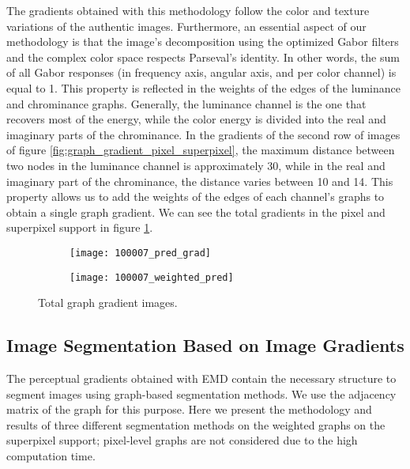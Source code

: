 The gradients obtained with this methodology follow the color and texture variations of the authentic images. Furthermore, an essential aspect of our methodology is that the image's decomposition using the optimized Gabor filters and the complex color space respects Parseval's identity. In other words, the sum of all Gabor responses (in frequency axis, angular axis, and per color channel) is equal to 1. This property is reflected in the weights of the edges of the luminance and chrominance graphs. Generally, the luminance channel is the one that recovers most of the energy, while the color energy is divided into the real and imaginary parts of the chrominance. In the gradients of the second row of images of figure \ref{fig:graph_gradient_pixel_superpixel}, the maximum distance between two nodes in the luminance channel is approximately 30, while in the real and imaginary part of the chrominance, the distance varies between 10 and 14. This property allows us to add the weights of the edges of each channel's graphs to obtain a single graph gradient. We can see the total gradients in the pixel and superpixel support in figure \ref{fig:total_graph_gradient_pixel_superpixel}.

\begin{figure}[!ht]
    \centering
    \begin{subfigure}[b]{0.49\textwidth}
    	\texttt{[image: 100007\_pred\_grad]} 
    \end{subfigure}      
    \begin{subfigure}[b]{0.49\textwidth}
        \texttt{[image: 100007\_weighted\_pred]}
    \end{subfigure}    
	\caption{Total graph gradient images.}\label{fig:total_graph_gradient_pixel_superpixel}    
\end{figure}

\subsection{Image Segmentation Based on Image Gradients}
The perceptual gradients obtained with EMD contain the necessary structure to segment images using graph-based segmentation methods. We use the adjacency matrix of the graph for this purpose. Here we present the methodology and results of three different segmentation methods on the weighted graphs on the superpixel support; pixel-level graphs are not considered due to the high computation time. 

